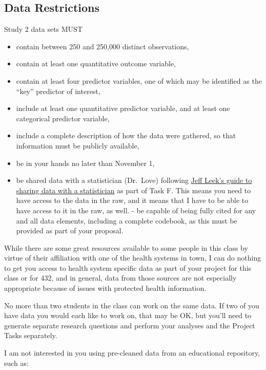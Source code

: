 \documentclass[]{book}
\providecommand{\tightlist}{%
  \setlength{\itemsep}{0pt}\setlength{\parskip}{0pt}}
\theoremstyle{definition}
\theoremstyle{definition}
\theoremstyle{definition}
\theoremstyle{remark}
\begin{document}
\hypertarget{data-restrictions}{%
\subsection{Data Restrictions}\label{data-restrictions}}

Study 2 data sets MUST

\begin{itemize}
\tightlist
\item
  contain between 250 and 250,000 distinct observations,
\item
  contain at least one quantitative outcome variable,
\item
  contain at least four predictor variables, one of which may be
  identified as the ``key'' predictor of interest,
\item
  include at least one quantitative predictor variable, and at least one
  categorical predictor variable,
\item
  include a complete description of how the data were gathered, so that
  information must be publicly available,
\item
  be in your hands no later than November 1,
\item
  be shared data with a statistician (Dr.~Love) following
  \href{https://github.com/jtleek/datasharing}{Jeff Leek's guide to
  sharing data with a statistician} as part of Task F. This means you
  need to have access to the data in the raw, and it means that I have
  to be able to have access to it in the raw, as well. - be capable of
  being fully cited for any and all data elements, including a complete
  codebook, as this must be provided as part of your proposal.
\end{itemize}

While there are some great resources available to some people in this
class by virtue of their affiliation with one of the health systems in
town, I can do nothing to get you access to health system specific data
as part of your project for this class or for 432, and in general, data
from those sources are not especially appropriate because of issues with
protected health information.

No more than two students in the class can work on the same data. If two
of you have data you would each like to work on, that may be OK, but
you'll need to generate separate research questions and perform your
analyses and the Project Tasks separately.

I am not interested in you using pre-cleaned data from an educational
repository, such as:
\end{document}
